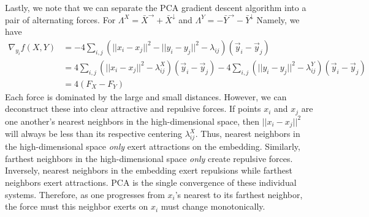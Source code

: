 \documentclass{article}
\theoremstyle{definition}
\begin{document}
Lastly, we note that we can separate the PCA gradient descent algorithm into a pair of alternating forces. For $\Lambda^X = \bar{X}^{\rightarrow}
+ \bar{X}^{\downarrow}$ and $\Lambda^Y = - \bar{Y}^{\rightarrow} - \bar{Y}^{\downarrow}$ Namely, we have
\begin{align*}
    \nabla_{y_i} f(X, Y) &= -4 \sum_{i, j} ( ||x_i - x_j||^2 - ||y_i - y_j||^2 - \lambda_{ij}) (\vec{y}_i - \vec{y}_j) \\
    &= 4 \sum_{i, j} (||x_i - x_j||^2 - \lambda^X_{ij}) (\vec{y}_i - \vec{y}_j) - 4 \sum_{i, j} (||y_i - y_j||^2 - \lambda^Y_{ij})(\vec{y}_i
    - \vec{y}_j) \\
    &= 4 \left( F_{X} - F_{Y} \right)
\end{align*}
Each force is dominated by the large and small distances. However, we can deconstruct these into clear attractive and repulsive forces. If points $x_i$
and $x_j$ are one another's nearest neighbors in the high-dimensional space, then $||x_i - x_j||^2$ will always be less than its respective centering
$\lambda^X_{ij}$. Thus, nearest neighbors in the high-dimensional space \textit{only} exert attractions on the embedding. Similarly, farthest
neighbors in the high-dimensional space \textit{only} create repulsive forces. Inversely, nearest neighbors in the embedding exert repulsions while
farthest neighbors exert attractions. PCA is the single convergence of these individual systems. Therefore, as one progresses from $x_i$'s nearest to its farthest neighbor, the force must this neighbor exerts on $x_i$ must change monotonically.
\end{document}
